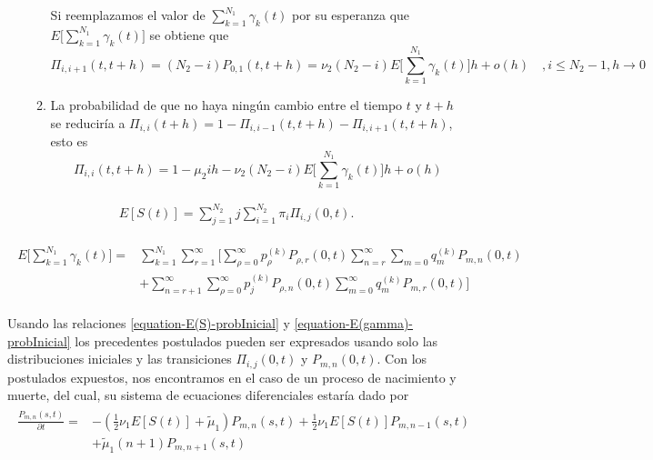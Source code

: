 \begin{itemize}
\begin{enumerate}
        Si reemplazamos el valor de $\sum_{k=1}^{N_1}\gamma_k(t)$ por su esperanza que $E\big[\sum_{k=1}^{N_1}\gamma_k(t)\big]$ se obtiene que
        $$\Pi_{i,i+1}(t,t+h)=(N_2-i)P_{0,1}(t,t+h)= \nu_2(N_2-i)E\bigg[\sum_{k=1}^{N_1}\gamma_k(t)\bigg]h+o(h)\quad ,i\leq N_2-1, h\rightarrow 0$$
        \item La probabilidad de que no haya ningún cambio entre el tiempo $t$ y $t+h$ se reduciría a  $\Pi_{i,i}(t+h)=1-\Pi_{i,i-1}(t,t+h)-\Pi_{i,i+1}(t,t+h)$, esto es $$\Pi_{i,i}(t,t+h)=1-\mu_2 i h-\nu_2(N_2-i)E\bigg[\sum_{k=1}^{N_1}\gamma_k(t)\bigg]h+o(h)$$
    \end{enumerate} 
\end{itemize}
\begin{Prop}
    \begin{eqnarray}
        E[S(t)]=\sum_{j=1}^{N_2}j\sum_{i=1}^{N_2}\pi_{i}\Pi_{i,j}(0,t).
        \label{equation-E(S)-probInicial}
    \end{eqnarray}
\end{Prop}
\begin{Prop}
    \begin{eqnarray}
    \label{equation-E(gamma)-probInicial}
        \begin{array}{cr}
            E\bigg[\sum_{k=1}^{N_1}\gamma_k(t)\bigg]=& \sum_{k=1}^{N_1}\sum_{r=1}^\infty\bigg[\sum_{\rho=0}^\infty p_\rho^{(k)}P_{\rho,r}(0,t)\sum_{n=r}^\infty\sum_{m=0}q_m^{(k)}P_{m,n}(0,t) \\
             &+\sum_{n=r+1}^\infty\sum_{\rho=0}^\infty p_j^{(k)}P_{\rho, n}(0,t)\sum_{m=0}^\infty q_m^{(k)}P_{m,r}(0,t)\bigg]
        \end{array}
    \end{eqnarray}
\end{Prop}
Usando las relaciones \ref{equation-E(S)-probInicial} y \ref{equation-E(gamma)-probInicial} los precedentes postulados pueden ser expresados usando solo las distribuciones iniciales y las transiciones $\Pi_{i,j}(0,t)$ y $P_{m,n}(0,t)$.
Con los postulados expuestos, nos encontramos en el caso de un proceso de nacimiento y muerte, del cual, su sistema de ecuaciones diferenciales estaría dado por
\begin{eqnarray}
    \begin{array}{cr}
        \frac{P_{m,n}(s,t)}{\partial t} = & -(\frac{1}{2}\nu_1E[S(t)]+\tilde{\mu}_1)P_{m,n}(s,t)+\frac{1}{2}\nu_1E[S(t)]P_{m,n-1}(s,t) \\
         & +\tilde{\mu}_1 (n+1)P_{m,n+1}(s,t)
    \end{array}
    \label{tesis-edo-p_n}
\end{eqnarray}
